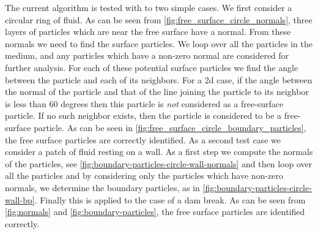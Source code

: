 \documentclass[preprint,12pt]{elsarticle}
\begin{document}
The current algorithm is tested with to two simple cases. We first consider a
circular ring of fluid. As can be seen from
\cref{fig:free_surface_circle_normals}, three layers of particles which are
near the free surface have a normal. From these normals we need to find the
surface particles. We loop over all the particles in the medium, and any
particles which have a non-zero normal are considered for further analysis.
For each of these potential surface particles we find the angle between the
particle and each of its neighbors. For a 2d case, if the angle between the
normal of the particle and that of the line joining the particle to its
neighbor is less than 60 degrees then this particle is \emph{not} considered
as a free-surface particle. If no such neighbor exists, then the particle is
considered to be a free-surface particle. As can be seen in
\cref{fig:free_surface_circle_boundary_particles}, the free surface particles
are correctly identified. As a second test case we consider a patch of fluid
resting on a wall. As a first step we compute the normals of the particles,
see \cref{fig:boundary-particles-circle-wall-normals} and then loop over all
the particles and by considering only the particles which have non-zero
normals, we determine the boundary particles, as in
\cref{fig:boundary-particles-circle-wall-bp}. Finally this is applied to the
case of a dam break. As can be seen from \cref{fig:normals} and
\cref{fig:boundary-particles}, the free surface particles are identified
correctly.
\end{document}
